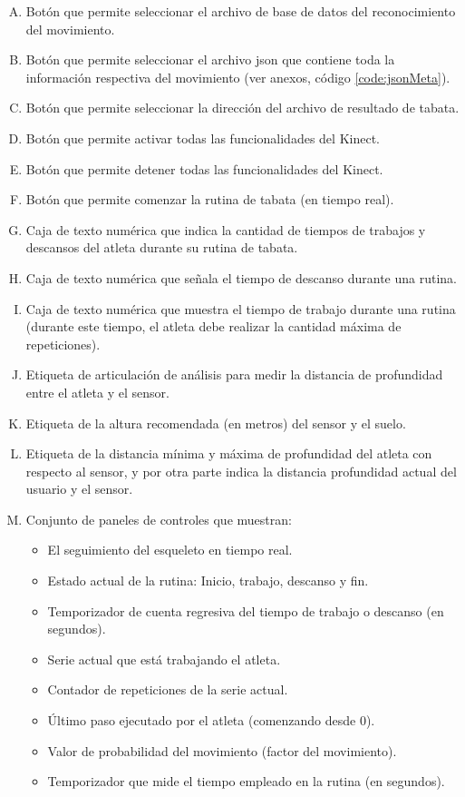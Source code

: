 \begin{enumerate}[A.]
    \item Bot\'on que permite seleccionar el archivo de base de datos del reconocimiento del movimiento.
    \item Bot\'on que permite seleccionar el archivo json que contiene toda la informaci\'on respectiva del movimiento (ver anexos, c\'odigo  \ref{code:jsonMeta}).
    \item Bot\'on que permite seleccionar la direcci\'on del archivo de resultado de tabata.
    \item Bot\'on que permite activar todas las funcionalidades del Kinect.    
    \item Bot\'on que permite detener todas las funcionalidades del Kinect. 
    \item Bot\'on que permite comenzar la rutina de tabata (en tiempo real).
   \item  Caja de texto num\'erica que indica la cantidad de tiempos de trabajos y descansos del atleta durante su rutina de tabata.
   \item  Caja de texto num\'erica que se\~nala el tiempo de descanso durante una rutina.
   \item  Caja de texto num\'erica que muestra el tiempo de trabajo durante una rutina (durante este tiempo, el atleta debe realizar la cantidad m\'axima de repeticiones).
   \item  Etiqueta de articulaci\'on de an\'alisis para medir la distancia de profundidad entre el atleta y el sensor.
   \item  Etiqueta de la altura  recomendada (en metros)  del sensor y el suelo.
      \item  Etiqueta de la distancia m\'inima y m\'axima de profundidad del atleta con respecto al sensor, y por otra parte indica la distancia profundidad actual del usuario y el sensor.
      \item Conjunto de paneles de controles que muestran:
      \begin{itemize}
            \item  El seguimiento del esqueleto en tiempo real.
            \item  Estado actual de la rutina: Inicio, trabajo, descanso y fin.
            \item  Temporizador de cuenta regresiva del tiempo de trabajo o descanso (en segundos).
             \item  Serie actual que est\'a trabajando el atleta.
             \item  Contador de repeticiones de la serie actual.
              \item \'Ultimo paso ejecutado por el atleta (comenzando desde 0).   
             \item  Valor de probabilidad del movimiento (factor del movimiento).
             \item  Temporizador que mide el tiempo    empleado en la rutina (en segundos).
      \end{itemize}
\end{enumerate}
